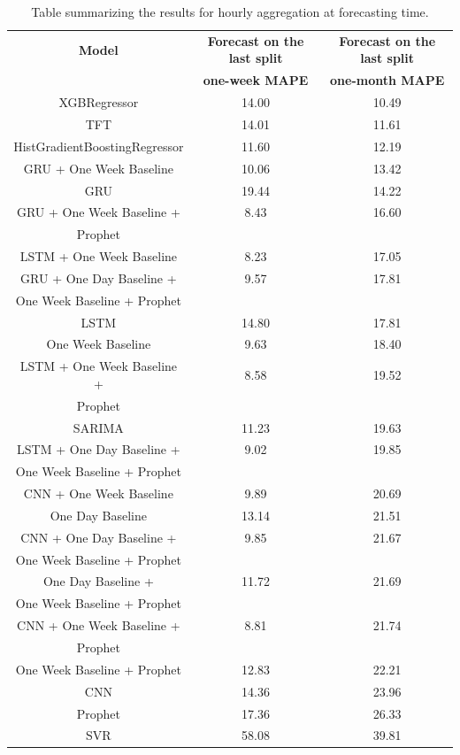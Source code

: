 \begin{table}[H]
\centering
\begin{tabular}{|c|c|c|}
\hline
\textbf{Model} & \textbf{Forecast on the last split} & \textbf{Forecast on the last split}\\
 & \textbf{one-week MAPE} & \textbf{one-month MAPE}\\
\hline
XGBRegressor & 14.00 & 10.49\\
\hline
TFT & 14.01 & 11.61\\
\hline
HistGradientBoostingRegressor & 11.60 & 12.19\\
\hline
GRU + One Week Baseline & 10.06 & 13.42\\
\hline
GRU & 19.44 & 14.22\\
\hline
GRU + One Week Baseline + & 8.43 & 16.60\\
Prophet & & \\
\hline
LSTM + One Week Baseline & 8.23 & 17.05\\
\hline
GRU + One Day Baseline + & 9.57 & 17.81\\
One Week Baseline + Prophet & & \\
\hline
LSTM & 14.80 & 17.81\\
\hline
One Week Baseline & 9.63 & 18.40\\
\hline
LSTM + One Week Baseline + & 8.58 & 19.52\\
Prophet & & \\
\hline
SARIMA & 11.23 & 19.63\\
\hline
LSTM + One Day Baseline + & 9.02 & 19.85\\
One Week Baseline + Prophet & & \\
\hline
CNN + One Week Baseline & 9.89 & 20.69\\
\hline
One Day Baseline & 13.14 & 21.51\\
\hline
CNN + One Day Baseline + & 9.85 & 21.67\\
One Week Baseline + Prophet & & \\
\hline
One Day Baseline + & 11.72 & 21.69\\
One Week Baseline + Prophet & & \\
\hline
CNN + One Week Baseline + & 8.81 & 21.74\\
Prophet & & \\
\hline
One Week Baseline + Prophet & 12.83 & 22.21\\
\hline
CNN & 14.36 & 23.96\\
\hline
Prophet & 17.36 & 26.33\\
\hline
SVR & 58.08 & 39.81\\
\hline
\end{tabular}
\caption{Table summarizing the results for hourly aggregation at forecasting time.}
\label{tab:demanddailyresultsforecast}
\end{table}

